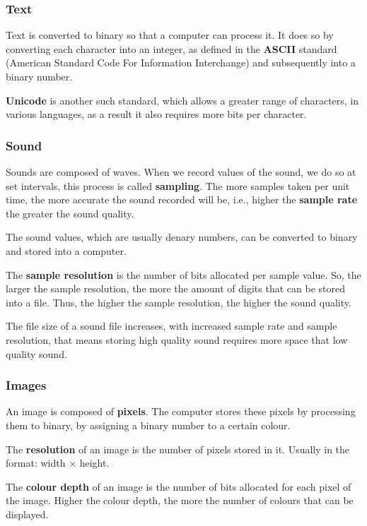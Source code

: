 \documentclass[twocolumn]{article}
\begin{document}
\subsubsection{Text}
Text is converted to binary so that a computer can process it. It does so by converting
each character into an integer, as defined in the \textbf{ASCII} standard (American 
Standard Code For Information Interchange) and subsequently into a binary number.

\textbf{Unicode} is another such standard, which allows a greater range of characters, in
various languages, as a result it also requires more bits per character.

\subsubsection{Sound}
Sounds are composed of waves. When we record values of the sound, we do so at set 
intervals, this process is called \textbf{sampling}. The more samples taken per unit
time, the more accurate the sound recorded will be, i.e., higher the \textbf{sample rate}
the greater the sound quality.

The sound values, which are usually denary numbers, can be converted to binary and stored
into a computer.

The \textbf{sample resolution} is the number of bits allocated per sample value. So, the 
larger the sample resolution, the more the amount of digits that can be stored into a 
file. Thus, the higher the sample resolution, the higher the sound quality.

The file size of a sound file increases, with increased sample rate and sample 
resolution, that means storing high quality sound requires more space that low quality
sound.

\subsubsection{Images}
An image is composed of \textbf{pixels}. The computer stores these pixels by processing
them to binary, by assigning a binary number to a certain colour. 

The \textbf{resolution} of an image is the number of pixels stored in it. Usually in the
format: width $\times$ height.

The \textbf{colour depth} of an image is the number of bits allocated for each pixel
of the image. Higher the colour depth, the more the number of colours that can be
displayed.
\end{document}
